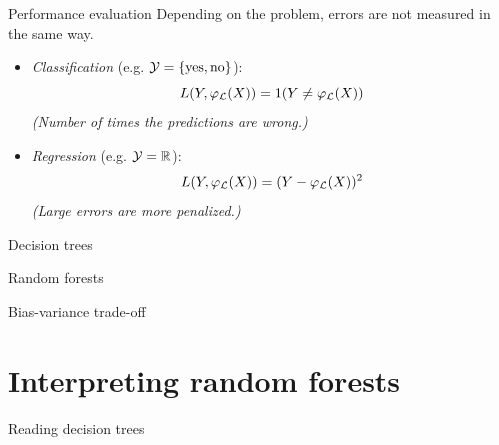 \documentclass{beamer}
\begin{document}
\begin{frame}{Performance evaluation}
Depending on the problem, errors are not measured in the same way.

\begin{itemize}

\item {\it Classification} (e.g. ${\cal Y} = \{ \text{yes}, \text{no} \}$):
  $$L(Y, \varphi_{\cal L}(X)) = 1(Y \neq \varphi_{\cal L}(X))$$
  {\it \footnotesize (Number of times the predictions are wrong.)}

\item {\it Regression} (e.g. ${\cal Y} = \mathbb{R}$):
  $$L(Y, \varphi_{\cal L}(X)) = (Y - \varphi_{\cal L}(X))^2$$
  {\it \footnotesize (Large errors are more penalized.)}

\end{itemize}

\end{frame}



\begin{frame}{Decision trees}
\end{frame}



\begin{frame}{Random forests}
\end{frame}



\begin{frame}{Bias-variance trade-off}
\end{frame}



\section{Interpreting random forests}

\begin{frame}{Reading decision trees}
\end{frame}
\end{document}
